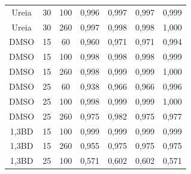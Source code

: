 \begin{table}[h]
{\begin{tabular}{c c c | c c c c}
				  Ureia   & 30        & 100        & 0,996   & 0,997    & 0,997    & 0,999      \\
				  Ureia   & 30        & 260        & 0,997   & 0,998    & 0,998    & 1,000      \\ \midrule
				  DMSO    & 15        & 60         & 0,960   & 0,971    & 0,971    & 0,994      \\
				  DMSO    & 15        & 100        & 0,998   & 0,998    & 0,998    & 0,999      \\
				  DMSO    & 15        & 260        & 0,998   & 0,999    & 0,999    & 1,000      \\
				  DMSO    & 25        & 60         & 0,938   & 0,966    & 0,966    & 0,996      \\
				  DMSO    & 25        & 100        & 0,998   & 0,999    & 0,999    & 1,000      \\
				  DMSO    & 25        & 260        & 0,975   & 0,982    & 0,975    & 0,977      \\
				  1,3BD   & 15        & 100        & 0,999   & 0,999    & 0,999    & 0,999      \\
				  1,3BD   & 15        & 260        & 0,955   & 0,975    & 0,975    & 0,975      \\
				  1,3BD   & 25        & 100        & 0,571   & 0,602    & 0,602    & 0,571		\\ \bottomrule
			\end{tabular}
		}{}
	\end{table}  

